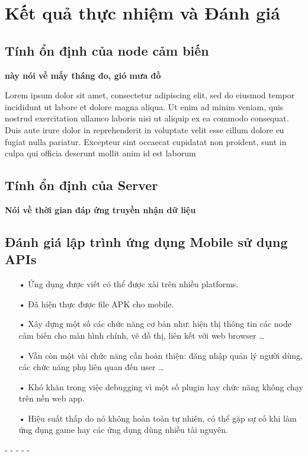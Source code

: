 \chapter{Kết quả thực nhiệm và Đánh giá}

\ifpdf
    \graphicspath{{Chapter4/Figs/Raster/}{Chapter4/Figs/PDF/}{Chapter4/Figs/}}
\else
    \graphicspath{{Chapter4/Figs/Vector/}{Chapter4/Figs/}}
\fi


\section{Tính ổn định của node cảm biến}
\textbf{này nói về mấy tháng đo, gió mưa đồ}

Lorem ipsum dolor sit amet, consectetur adipiscing elit, sed do eiusmod tempor incididunt ut labore et dolore magna aliqua. Ut enim ad minim veniam, quis nostrud exercitation ullamco laboris nisi ut aliquip ex ea commodo consequat. Duis aute irure dolor in reprehenderit in voluptate velit esse cillum dolore eu fugiat nulla pariatur. Excepteur sint occaecat cupidatat non proident, sunt in culpa qui officia deserunt mollit anim id est laborum
\section{Tính ổn định của Server}
\textbf{Nói về thời gian đáp ứng truyền nhận dữ liệu}


\section{Đánh giá lập trình ứng dụng Mobile sử dụng APIs}
\begin{itemize}
\item[•]Ứng dụng được viết có thể được xài trên nhiều platforms.
\item[•]Đã hiện thực được file APK cho mobile.
\item[•]Xây dựng một số các chức năng cơ bản như: hiện thị thông tin các node cảm biến cho màn hình chính, vẽ đồ thị, liên kết với web browser …
\item[•] Vẫn còn một vài chức năng cần hoàn thiện: đăng nhập quản lý người dùng, các chức năng phụ liên quan đến user …
\item[•] Khó khăn trong việc debugging vì một số plugin hay chức năng không chạy trên nền web app. 
\item[•]Hiệu suất thấp do nó không hoàn toàn tự nhiên, có thể gặp sự cố khi làm ứng dụng game hay các ứng dụng dùng nhiều tài nguyên.

\end{itemize}

- 	
-	
-	
-	
-	

